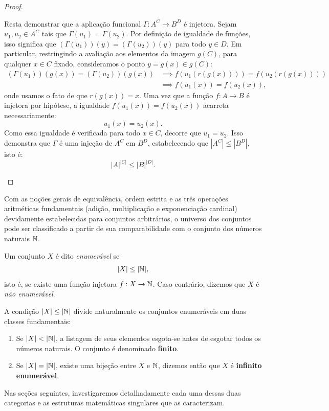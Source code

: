 \begin{proof}
\begin{enumerate}
              Resta demonstrar que a aplicação funcional \(\Gamma: A^C \to B^D\) é injetora. Sejam \(u_1, u_2 \in A^C\) tais que \(\Gamma(u_1) = \Gamma(u_2)\). Por definição de igualdade de funções, isso significa que \((\Gamma(u_1))(y) = (\Gamma(u_2))(y)\) para todo \(y \in D\).
              Em particular, restringindo a avaliação aos elementos da imagem \(g(C)\), para qualquer \(x \in C\) fixado, consideramos o ponto \(y = g(x) \in g(C)\):
              \begin{align*}
                  (\Gamma(u_1))(g(x)) = (\Gamma(u_2))(g(x)) & \implies f(u_1(r(g(x)))) = f(u_2(r(g(x)))) \\
                                                            & \implies f(u_1(x)) = f(u_2(x)),
              \end{align*}
              onde usamos o fato de que \(r(g(x)) = x\). Uma vez que a função \(f: A \to B\) é injetora por hipótese, a igualdade \(f(u_1(x)) = f(u_2(x))\) acarreta necessariamente:
              \[
                  u_1(x) = u_2(x).
              \]
              Como essa igualdade é verificada para todo \(x \in C\), decorre que \(u_1 = u_2\). Isso demonstra que \(\Gamma\) é uma injeção de \(A^C\) em \(B^D\), estabelecendo que \(|A^C| \leq |B^D|\), isto é:
              \[
                  |A|^{|C|} \leq |B|^{|D|}.
              \]
    \end{enumerate}
\end{proof}

Com as noções gerais de equivalência, ordem estrita e as três operações aritméticas fundamentais (adição, multiplicação e exponenciação cardinal) devidamente estabelecidas para conjuntos arbitrários, o universo dos conjuntos pode ser classificado a partir de sua comparabilidade com o conjunto dos números naturais \(\mathbb{N}\).

\begin{definicao}
    \label{def:conjunto_enumeravel_geral}
    Um conjunto \(X\) é dito \emph{enumerável} se
    \[
        |X| \leq |\mathbb{N}|,
    \]
    isto é, se existe uma função injetora \(f: X \to \mathbb{N}\). Caso contrário, dizemos que \(X\) é \emph{não enumerável}.
\end{definicao}

A condição \(|X| \leq |\mathbb{N}|\) divide naturalmente os conjuntos enumeráveis em duas classes fundamentais:
\begin{enumerate}
    \item Se \(|X| < |\mathbb{N}|\), a listagem de seus elementos esgota-se antes de esgotar todos os números naturais. O conjunto é denominado \textbf{finito}.
    \item Se \(|X| = |\mathbb{N}|\), existe uma bijeção entre \(X\) e \(\mathbb{N}\), dizemos então que \(X\) é \textbf{infinito enumerável}.
\end{enumerate}
Nas seções seguintes, investigaremos detalhadamente cada uma dessas duas categorias e as estruturas matemáticas singulares que as caracterizam.

